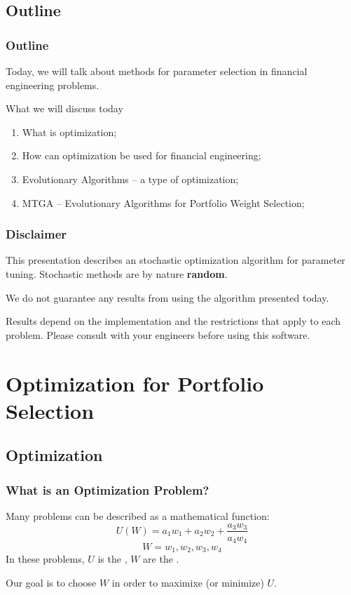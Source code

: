 \documentclass{beamer}[10pt]
\begin{document}
\subsection{Outline}
\begin{frame}
  \frametitle{Outline} 

  Today, we will talk about methods for parameter
  selection in financial engineering problems.

  \begin{block}{What we will discuss today}
    \begin{enumerate}
      \item What is optimization;
      \item How can optimization be used for financial engineering;
      \item Evolutionary Algorithms -- a type of optimization;
      \item MTGA -- Evolutionary Algorithms for Portfolio Weight Selection;
    \end{enumerate}
  \end{block}
\end{frame}

\begin{frame}
  \frametitle{Disclaimer} 

  This presentation describes an stochastic optimization algorithm for
  parameter tuning. Stochastic methods are by nature {\bf random}.

  \medskip

  \alert{We do not guarantee any results from using
    the algorithm presented today}.
  
  \medskip

  Results depend on the implementation and the restrictions that apply
  to each problem. Please consult with your engineers before using
  this software.
\end{frame}

\section{Optimization for Portfolio Selection}
\subsection{Optimization}
\begin{frame}
  \frametitle{What is an Optimization Problem?}
  Many problems can be described as a mathematical function:
  \begin{equation}
    U(W) = a_1w_1 + a_2w_2 + \frac{a_3w_3}{a_4w_4}
  \end{equation}
  \begin{equation}
    W = w_1,w_2,w_3,w_4
  \end{equation}
  In these problems, $U$ is the , $W$ are
  the .
  
  \medskip
  
  \begin{block}{}
    Our goal is to choose $W$ in order to maximixe (or minimize) $U$.
  \end{block}
\end{frame}
\end{document}
